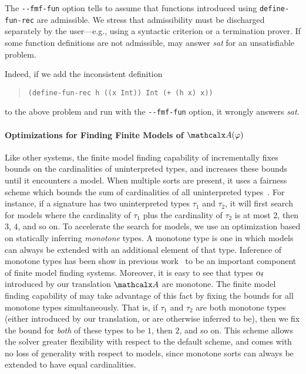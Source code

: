 The \texttt{-}\texttt{-fmf-fun} option tells \cvc to assume that
functions introduced using \texttt{define-\allowbreak fun-\allowbreak rec} are admissible.
We stress that admissibility must be discharged separately by the user---e.g., using a
syntactic criterion or a termination prover.
If some function definitions are not admissible, \cvc may answer \emph{sat} for
an unsatisfiable problem. 
\begin{rep}
Indeed, if we add the inconsistent definition
%
\begin{quote}
\begin{verbatim}
(define-fun-rec h ((x Int)) Int (+ (h x) x))
\end{verbatim}
\end{quote}
%
to the above problem and run \cvc with the \texttt{-}\texttt{-fmf-fun} option,
it wrongly answers \emph{sat}.
\end{rep}

\paragraph{Optimizations for Finding Finite Models of $\conv(\varphi)$}
Like other systems,
the finite model finding capability of \cvc incrementally fixes bounds on the cardinalities of uninterpreted types,
and increases these bounds until it encounters a model.
When multiple sorts are present, it uses a fairness scheme which
bounds the sum of cardinalities of all uninterpreted types~\cite{reynolds2013finite}.
For instance, if a signature has two uninterpreted types $\tau_1$ and $\tau_2$,
it will first search for models where 
the cardinality of $\tau_1$ plus the cardinality of $\tau_2$ is at most $2$,
then $3$, $4$, and so on.
To accelerate the search for models,
we use an optimization based on statically inferring \emph{monotone} types.
A monotone type is one in which models can always be extended with an additional element of that type.
Inference of monotone types has been show in previous work~\cite{claessen2011mono,korovin-2013}
to be an important component of finite model finding systems.
Moreover, it is easy to see that types $\alpha_{\mathsf{f}}$ introduced by our translation $\conv$ are monotone.
The finite model finding capability of \cvc may take advantage of this fact by fixing the bounds for all 
monotone types simultaneously.
That is, if $\tau_1$ and $\tau_2$ are both monotone types (either introduced by our translation, or are otherwise inferred to be),
then we fix the bound for \emph{both} of these types to be $1$, then $2$, and so on.
This scheme allows the solver greater flexibility with respect to the default scheme,
and comes with no loss of generality with respect to models, since monotone sorts can always be extended to have equal cardinalities.

